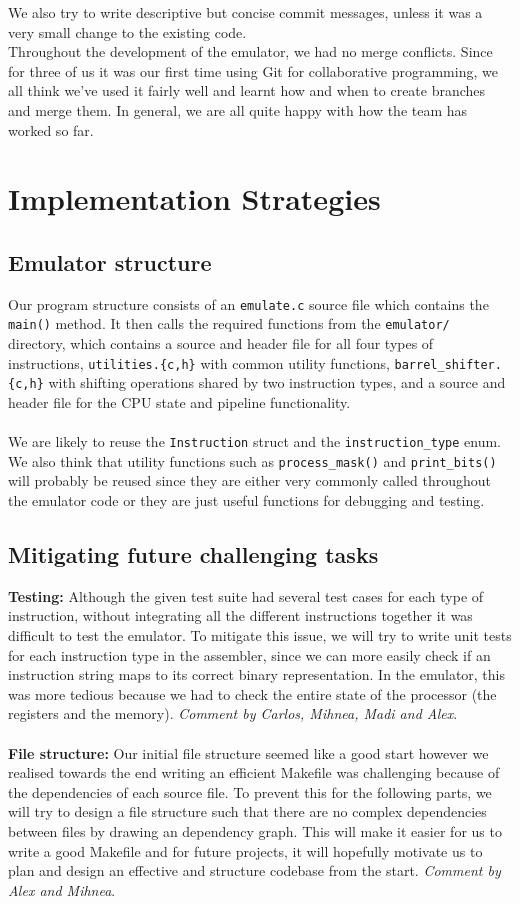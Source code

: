 \documentclass[11pt]{article}
\begin{document}
We also try to write descriptive but concise commit messages, unless it was a very small change to the existing code.\\
Throughout the development of the emulator, we had no merge conflicts. Since for three of us it was our first time using Git for collaborative programming, we all think we’ve used it fairly well and learnt how and when to create branches and merge them. In general, we are all quite happy with how the team has worked so far.


\section{Implementation Strategies}
\subsection{Emulator structure}
Our program structure consists of an \texttt{emulate.c} source file which contains the \texttt{main()} method. It then calls the required functions from the \texttt{emulator/} directory, which contains a source and header file for all four types of instructions, \texttt{utilities.\{c,h\}} with common utility functions, \texttt{barrel\_shifter.\{c,h\}} with shifting operations shared by two instruction types, and a source and header file for the CPU state and pipeline functionality.
\\\\
We are likely to reuse the \texttt{Instruction} struct and the \texttt{instruction\_type} enum. We also think that utility functions such as  \texttt{process\_mask()} and \texttt{print\_bits()} will probably be reused since they are either very commonly called throughout the emulator code or they are just useful functions for debugging and testing.

\subsection{Mitigating future challenging tasks}
\textbf{Testing:} Although the given test suite had several test cases for each type of instruction, without integrating all the different instructions together it was difficult to test the emulator. To mitigate this issue, we will try to write unit tests for each instruction type in the assembler, since we can more easily check if an instruction string maps to its correct binary representation. In the emulator, this was more tedious because we had to check the entire state of the processor (the registers and the memory). \textit{Comment by Carlos, Mihnea, Madi and Alex}.\\\\
\textbf{File structure:} Our initial file structure seemed like a good start however we realised towards the end writing an efficient Makefile was challenging because of the dependencies of each source file. To prevent this for the following parts, we will try to design a file structure such that there are no complex dependencies between files by drawing an dependency graph. This will make it easier for us to write a good Makefile and for future projects, it will hopefully motivate us to plan and design an effective and structure codebase from the start. \textit{Comment by Alex and Mihnea}.
\end{document}
